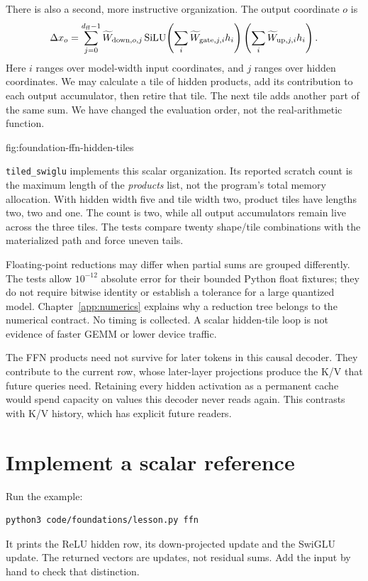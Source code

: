 There is also a second, more instructive organization. The output
coordinate $o$ is
\[
 \Delta x_o=\sum_{j=0}^{d_{\rm ff}-1}
    \widetilde W_{{\rm down},o,j}
    \operatorname{SiLU}\!\left(\sum_i
       \widetilde W_{{\rm gate},j,i}h_i\right)
    \left(\sum_i\widetilde W_{{\rm up},j,i}h_i\right).
\]
Here $i$ ranges over model-width input coordinates, and $j$ ranges
over hidden coordinates. We may calculate a tile of hidden products,
add its contribution to each output accumulator, then retire that tile.
The next tile adds another part of the same sum. We have changed
the evaluation order, not the real-arithmetic function.

{fig:foundation-ffn-hidden-tiles}

\texttt{tiled\_swiglu} implements this scalar organization. Its reported
scratch count is the maximum length of the \emph{products} list, not the
program's total memory allocation. With hidden width five and tile width
two, product tiles have lengths two, two and one. The count is two,
while all output accumulators remain live across the three tiles.
The tests compare twenty shape/tile combinations with the materialized
path and force uneven tails.

Floating-point reductions may differ when partial sums are grouped
differently. The tests allow $10^{-12}$ absolute error for their bounded
Python float fixtures; they do not require bitwise identity or establish
a tolerance for a large quantized model. Chapter~\ref{app:numerics}
explains why a reduction tree belongs to the numerical contract.
No timing is collected. A scalar hidden-tile loop is not evidence of
faster GEMM or lower device traffic.

The FFN products need not survive for later tokens in this causal decoder.
They contribute to the current row, whose later-layer projections produce
the K/V that future queries need. Retaining every hidden activation as a
permanent cache would spend capacity on values this decoder never reads
again. This contrasts with K/V history, which has explicit future readers.

\section{Implement a scalar reference}
Run the example:
\begin{verbatim}
python3 code/foundations/lesson.py ffn
\end{verbatim}
It prints the ReLU hidden row, its down-projected update and the SwiGLU
update. The returned vectors are updates, not residual sums. Add the
input by hand to check that distinction.

